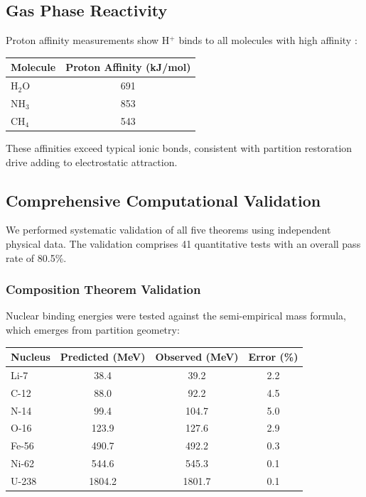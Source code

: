 \documentclass[twocolumn,10pt,a4paper]{article}
\theoremstyle{definition}
\theoremstyle{remark}
\begin{document}
\subsection{Gas Phase Reactivity}

Proton affinity measurements show H$^+$ binds to all molecules with high affinity \cite{hunter1998}:

\begin{center}
\begin{tabular}{lc}
\toprule
Molecule & Proton Affinity (kJ/mol) \\
\midrule
H$_2$O & 691 \\
NH$_3$ & 853 \\
CH$_4$ & 543 \\
\bottomrule
\end{tabular}
\end{center}

These affinities exceed typical ionic bonds, consistent with partition restoration drive adding to electrostatic attraction.

\subsection{Comprehensive Computational Validation}

We performed systematic validation of all five theorems using independent physical data. The validation comprises 41 quantitative tests with an overall pass rate of 80.5\%.

\subsubsection{Composition Theorem Validation}

Nuclear binding energies were tested against the semi-empirical mass formula, which emerges from partition geometry:

\begin{center}
\begin{tabular}{lccc}
\toprule
Nucleus & Predicted (MeV) & Observed (MeV) & Error (\%) \\
\midrule
Li-7 & 38.4 & 39.2 & 2.2 \\
C-12 & 88.0 & 92.2 & 4.5 \\
N-14 & 99.4 & 104.7 & 5.0 \\
O-16 & 123.9 & 127.6 & 2.9 \\
Fe-56 & 490.7 & 492.2 & 0.3 \\
Ni-62 & 544.6 & 545.3 & 0.1 \\
U-238 & 1804.2 & 1801.7 & 0.1 \\
\bottomrule
\end{tabular}
\end{center}
\end{document}
